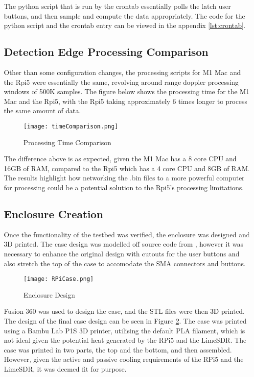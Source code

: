 The python script that is run by the crontab essentially polls the latch user buttons, and then sample and compute the data appropriately. The code for the python script and the crontab entry can be viewed in the appendix \ref{lst:crontab}.

\subsection{Detection Edge Processing Comparison} \label{sec:edgeProcessing}
Other than some configuration changes, the processing scripts for M1 Mac and the Rpi5 were essentially the same, revolving around range doppler processing windows of 500K samples. The figure below shows the processing time for the M1 Mac and the Rpi5, with the Rpi5 taking approximately 6 times longer to process the same amount of data.

\begin{figure}[h!]
    \centering
    \texttt{[image: timeComparison.png]}
    \caption{Processing Time Comparison}
    \label{fig:processingTime}
\end{figure}

The difference above is as expected, given the M1 Mac has a 8 core CPU and 16GB of RAM, compared to the Rpi5 which has a 4 core CPU and 8GB of RAM. The results highlight how networking the .bin files to a more powerful computer for processing could be a potential solution to the Rpi5's processing limitations.

\subsection{Enclosure Creation} \label{sec:enclosureResults}
Once the functionality of the testbed was verified, the enclosure was designed and 3D printed. The case design was modelled off source code from \cite{RPiCase}, however it was necessary to enhance the original design with cutouts for the user buttons and also stretch the top of the case to accomodate the SMA connectors and buttons. 

\begin{figure}[h!]
    \centering
    \texttt{[image: RPiCase.png]}
    \caption{Enclosure Design}
    \label{fig:enclosureDesign}
\end{figure}

Fusion 360 was used to design the case, and the STL files were then 3D printed. The design of the final case design can be seen in Figure \ref{fig:enclosureDesign}. The case was printed using a Bambu Lab P1S 3D printer, utilising the default PLA filament, which is not ideal given the potential heat generated by the RPi5 and the LimeSDR. The case was printed in two parts, the top and the bottom, and then assembled. However, given the active and passive cooling requirements of the RPi5 and the LimeSDR, it was deemed fit for purpose.


